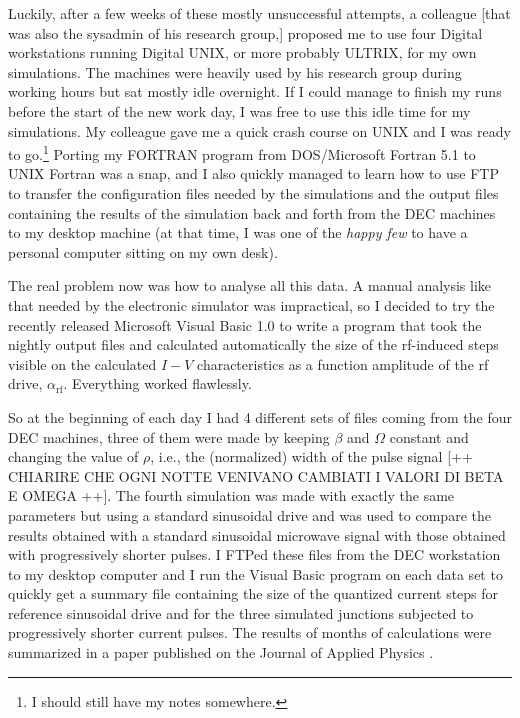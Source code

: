 Luckily, after a few weeks of these mostly unsuccessful attempts, a colleague [that was also the sysadmin of his research group,] proposed me to use four Digital workstations running Digital UNIX, or more probably ULTRIX, for my own simulations. The machines were heavily used by his research group during working hours but sat mostly idle overnight. If I could manage to finish my runs before the start of the new work day, I was free to use this idle time for my simulations. My colleague gave me a quick crash course on UNIX and I was ready to go.\footnote{I should still have my notes somewhere.} Porting my FORTRAN program from DOS/Microsoft Fortran 5.1 to UNIX Fortran was a snap, and I also quickly managed to learn how to use FTP to transfer the configuration files needed by the simulations and the output files containing the results of the simulation back and forth from the DEC machines to my desktop machine (at that time, I was one of the \emph{happy few} to have a personal computer sitting on my own desk).

The real problem now was how to analyse all this data. A manual analysis like that needed by the electronic simulator was impractical, so I decided to try the recently released Microsoft Visual Basic 1.0 to write a program that took the nightly output files and calculated automatically the size of the rf-induced steps visible on the calculated $I-V$ characteristics as a function amplitude of the rf drive, $\alpha_\mathrm{rf}$.
Everything worked flawlessly.

So at the beginning of each day I had 4 different sets of files coming from the four DEC machines, three of them were made by keeping $\beta$ and $\Omega$ constant and changing the value of $\rho$, i.e., the (normalized) width of the pulse signal [++ CHIARIRE CHE OGNI NOTTE VENIVANO CAMBIATI I VALORI DI BETA E OMEGA ++]. The fourth simulation was made with exactly the same parameters but using a standard sinusoidal drive and was used to compare the results obtained with a standard sinusoidal microwave signal with those obtained with progressively shorter pulses.
I FTPed these files from the DEC workstation to my desktop computer and I run the Visual Basic program on each data set to quickly get a summary file containing the size of the quantized current steps for reference sinusoidal drive and for the three simulated junctions subjected to progressively shorter current pulses. The results of months of calculations were summarized in a paper published on the Journal of Applied Physics \cite{Maggi:1996}.


